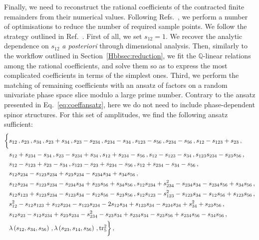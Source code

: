 \documentclass[main.tex]{subfiles}
\begin{document}
Finally, we need to reconstruct the rational coefficients of the contracted finite remainders from their numerical values. Following Refs.~\cite{Abreu:2018zmy,Badger:2021nhg,Badger:2021imn,Badger:2021ega}, we perform a number of optimisations to reduce the number of required sample points. We follow the strategy outlined in Ref.~\cite{Badger:2021imn}. First of all, we set $s_{12}=1$. We recover the analytic dependence on $s_{12}$ \textit{a posteriori} through dimensional analysis. Then, similarly to the workflow outlined in Section~\ref{Hbbsec:reduction}, we fit the $\mathbb{Q}$-linear relations among the rational coefficients, and solve them so as to express the most complicated coefficients in terms of the simplest ones. Third, we perform the matching of remaining coefficients with an ansatz of factors on a random univariate phase space slice modulo a large prime number. Contrary to the ansatz presented in Eq.~\ref{eq:coeffansatz}, here we do not need to include phase-dependent spinor structures. For this set of amplitudes, we find the following ansatz sufficient:
\begin{align} \label{Wyjeq:coeffansatz}
\begin{aligned} 
\biggl\{ & s_{12}\,, s_{23}\,, s_{34}\,, s_{23} + s_{34}\,, s_{23} - s_{234}\,, s_{234} - s_{34}\,, s_{123} - s_{56}\,, s_{234} - s_{56}\,, s_{12} - s_{123} + s_{23}\,, \\
& s_{12} + s_{234} - s_{34} \,, s_{23} - s_{234} + s_{34}\,, s_{12} + s_{234} - s_{56}\,, s_{12} - s_{123} - s_{34}\,, s_{123} s_{234} - s_{23} s_{56}\,, \\
& s_{12} - s_{123} + s_{23} - s_{34} \,, s_{123} - s_{23} + s_{234} - s_{56} \,, s_{12} + s_{234} - s_{34} - s_{56} \,, \\
& s_{12} s_{234} - s_{123} s_{234} + s_{23} s_{234} - s_{234} s_{34} + s_{34} s_{56} \,, \\
& s_{12} s_{234} - s_{123} s_{234} - s_{234} s_{34} + s_{23} s_{56} + s_{34} s_{56} \,, s_{12} s_{234} + s_{234}^2 - s_{234} s_{34} - s_{234} s_{56} + s_{34} s_{56} \,, \\
& s_{12} s_{123} + s_{123} s_{234} - s_{123} s_{34} - s_{12} s_{56} - s_{23} s_{56} \,, s_{12} s_{123} - s_{123}^2 - s_{123} s_{34} - s_{12} s_{56} + s_{123} s_{56} \,, \\
& s_{12}^2 - s_{12} s_{123} + s_{12} s_{234} - s_{123} s_{234} - 2 s_{12} s_{34} + s_{123} s_{34} - s_{234} s_{34} + s_{34}^2 + s_{23} s_{56} \,, \\
& s_{12} s_{23} - s_{12} s_{234} + s_{23} s_{234} - s_{234}^2 - s_{23} s_{34} + s_{234} s_{34} - s_{23} s_{56} + s_{234} s_{56} - s_{34} s_{56} \,, \\
& \lambda\left(s_{12}, s_{34}, s_{56} \right) \,, \lambda\left(s_{23}, s_{14}, s_{56}\right) \,, \operatorname{\rm tr}_5^2 \biggr\} \,,
\end{aligned}
\end{align}
\end{document}
